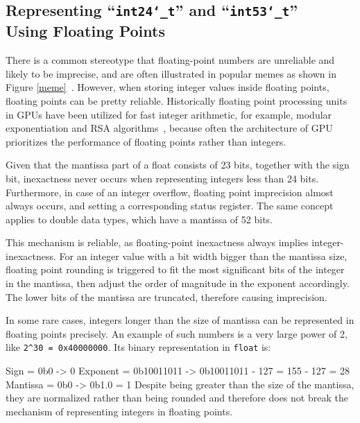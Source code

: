 \documentclass[logo,bsc,singlespacing,parskip]{infthesis}
\newcommand{\dtfloat}{\texttt{float}}
\newcommand{\dtfloati}{\texttt{int24\char`_t}}
\newcommand{\dtdoublei}{\texttt{int53\char`_t}}
\newenvironment{VerbatimCompact}
  {\vspace*{-2.5mm}\VerbatimEnvironment
   \par\Verbatim}
  {\endVerbatim\vspace*{-2.4mm}}
\begin{document}
\subsection{Representing ``\dtfloati{}'' and ``\dtdoublei{}'' \\ Using Floating Points}
\label{sec:fpe2}

There is a common stereotype that floating-point numbers are unreliable and
likely to be imprecise, and are often illustrated in popular memes as shown in
Figure \ref{meme}~\cite{meme}. However, when storing integer values inside
floating points, floating points can be pretty reliable. Historically
floating point processing units in GPUs have been utilized for fast integer
arithmetic, for example, modular exponentiation and RSA
algorithms~\cite{intfpu-modexp}, because often the architecture of GPU prioritizes
the performance of floating points rather than integers. 

Given that the mantissa part of a float consists of 23 bits, together with the sign bit,
inexactness never occurs when representing integers less than 24 bits. 
Furthermore, in case of an integer overflow, floating point
imprecision almost always occurs, and setting a corresponding status register.
The same concept applies to double data types, which have a mantissa 
of 52 bits.

This mechanism is reliable, as floating-point inexactness always implies 
integer\linebreak-inexactness. For an integer value with a bit width bigger than the
mantissa size, floating point rounding is triggered to fit the most
significant bits of the integer in the mantissa, then adjust the order of
magnitude in the exponent accordingly. The lower bits of the mantissa are
truncated, therefore causing imprecision. 

In some rare cases, integers longer than the size of mantissa can be represented
in floating points precisely. An example of such numbers is a very large power
of 2, like \texttt{2\^{}30 = 0x40000000}. Its binary representation in
\dtfloat{} is:
\begin{VerbatimCompact}
Sign     = 0b0        -> 0     
Exponent = 0b10011011 -> 0b10011011 - 127 = 155 - 127 = 28             
Mantissa = 0b0        -> 0b1.0 = 1
\end{VerbatimCompact}
Despite being greater than the size of
the mantissa, they are normalized rather than being rounded and therefore does
not break the mechanism of representing integers in floating points.
\end{document}
